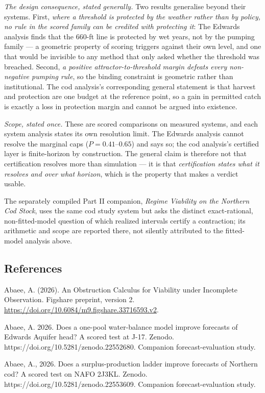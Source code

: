 \documentclass[11pt]{article}
\begin{document}
\emph{The design consequence, stated generally.} Two results generalise beyond their systems. First,
\emph{where a threshold is protected by the weather rather than by policy, no rule in the scored
family can be credited with protecting it}: The Edwards analysis finds that the 660-ft line is protected by wet
years, not by the pumping family --- a geometric property of scoring triggers against their own
level, and one that would be invisible to any method that only asked whether the threshold was
breached. Second, \emph{a positive attractor-to-threshold margin defeats every non-negative pumping
rule}, so the binding constraint is geometric rather than institutional. The cod analysis's corresponding
general statement is that harvest and protection are one budget at the reference point, so a gain in
permitted catch is exactly a loss in protection margin and cannot be argued into existence.

\emph{Scope, stated once.} These are scored comparisons on measured systems, and each system analysis states
its own resolution limit. The Edwards analysis cannot resolve the marginal caps ($P = 0.41$--$0.65$) and says so;
the cod analysis's certified layer is finite-horizon by construction. The general claim is therefore not that
certification resolves more than simulation --- it is that \emph{certification states what it
resolves and over what horizon}, which is the property that makes a verdict usable.

\noindent The separately compiled Part II companion, \emph{Regime Viability on the Northern Cod Stock},
uses the same cod study system but asks the distinct exact-rational, non-fitted-model
question of which realized intervals certify a contraction; its arithmetic and scope
are reported there, not silently attributed to the fitted-model analysis above.

\subsection*{References}
\label{references}
Abaee, A. (2026). An Obstruction Calculus for Viability under Incomplete Observation. Figshare preprint, version 2. \url{https://doi.org/10.6084/m9.figshare.33716593.v2}.

Abaee, A. 2026. Does a one-pool water-balance model improve forecasts of
Edwards Aquifer head? A scored test at J-17. Zenodo.
https://doi.org/10.5281/zenodo.22552680. Companion forecast-evaluation
study.

Abaee, A., 2026. Does a surplus-production ladder improve forecasts of
Northern cod? A scored test on NAFO 2J3KL. Zenodo.
https://doi.org/10.5281/zenodo.22553609. Companion forecast-evaluation
study.
\end{document}
